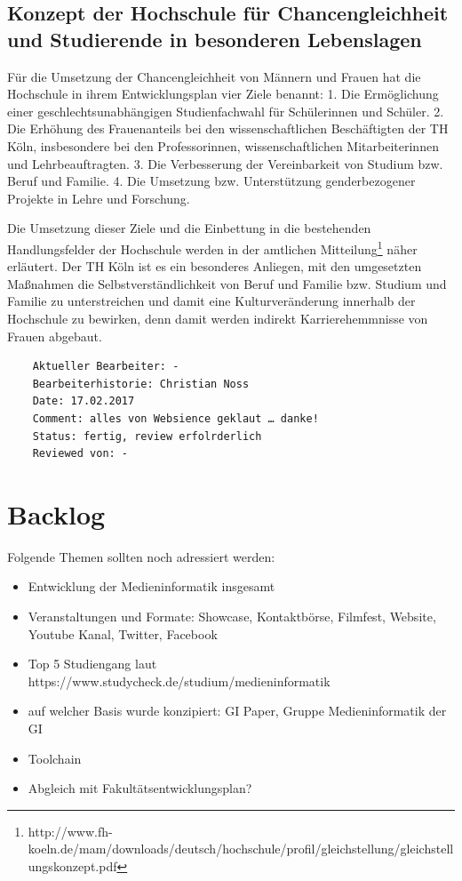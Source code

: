 \section{Konzept der Hochschule für Chancengleichheit und Studierende
in besonderen
Lebenslagen}\label{konzept-der-hochschule-fuxfcr-chancengleichheit-und-studierende-in-besonderen-lebenslagen}

Für die Umsetzung der Chancengleichheit von Männern und Frauen hat die
Hochschule in ihrem Entwicklungsplan vier Ziele benannt: 1. Die
Ermöglichung einer geschlechtsunabhängigen Studienfachwahl für
Schülerinnen und Schüler. 2. Die Erhöhung des Frauenanteils bei den
wissenschaftlichen Beschäftigten der TH Köln, insbesondere bei den
Professorinnen, wissenschaftlichen Mitarbeiterinnen und
Lehrbeauftragten. 3. Die Verbesserung der Vereinbarkeit von Studium bzw.
Beruf und Familie. 4. Die Umsetzung bzw. Unterstützung genderbezogener
Projekte in Lehre und Forschung.

Die Umsetzung dieser Ziele und die Einbettung in die bestehenden
Handlungsfelder der Hochschule werden in der amtlichen
Mitteilung\footnote{http://www.fh-koeln.de/mam/downloads/deutsch/hochschule/profil/gleichstellung/gleichstellungskonzept.pdf}
näher erläutert. Der TH Köln ist es ein besonderes Anliegen, mit den
umgesetzten Maßnahmen die Selbstverständlichkeit von Beruf und Familie
bzw. Studium und Familie zu unterstreichen und damit eine
Kulturveränderung innerhalb der Hochschule zu bewirken, denn damit
werden indirekt Karrierehemmnisse von Frauen abgebaut.

\begin{verbatim}
    Aktueller Bearbeiter: -
    Bearbeiterhistorie: Christian Noss
    Date: 17.02.2017
    Comment: alles von Websience geklaut … danke!
    Status: fertig, review erfolrderlich
    Reviewed von: -
\end{verbatim}

\chapter{Backlog}\label{backlog}

Folgende Themen sollten noch adressiert werden:

\begin{itemize}
\tightlist
\item
  Entwicklung der Medieninformatik insgesamt
\item
  Veranstaltungen und Formate: Showcase, Kontaktbörse, Filmfest,
  Website, Youtube Kanal, Twitter, Facebook
\item
  Top 5 Studiengang laut
  https://www.studycheck.de/studium/medieninformatik
\item
  auf welcher Basis wurde konzipiert: GI Paper, Gruppe Medieninformatik
  der GI
\item
  Toolchain
\item
  Abgleich mit Fakultätsentwicklungsplan?
\end{itemize}

